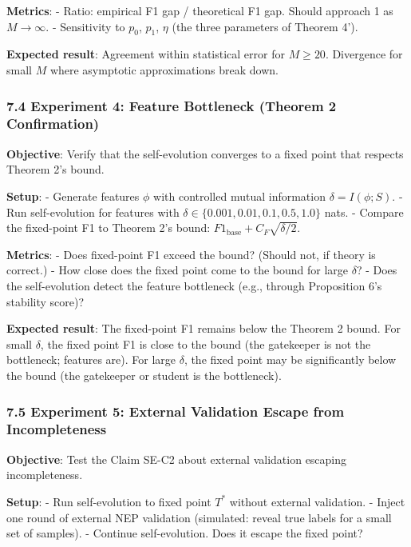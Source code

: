 \documentclass[
  12pt,
]{ctexart}
\begin{document}
\textbf{Metrics}: - Ratio: empirical F1 gap / theoretical F1 gap. Should
approach 1 as \(M \to \infty\). - Sensitivity to \(p_0\), \(p_1\),
\(\eta\) (the three parameters of Theorem 4').

\textbf{Expected result}: Agreement within statistical error for
\(M \geq 20\). Divergence for small \(M\) where asymptotic
approximations break down.

\subsubsection{7.4 Experiment 4: Feature Bottleneck (Theorem 2
Confirmation)}\label{experiment-4-feature-bottleneck-theorem-2-confirmation}

\textbf{Objective}: Verify that the self-evolution converges to a fixed
point that respects Theorem 2's bound.

\textbf{Setup}: - Generate features \(\phi\) with controlled mutual
information \(\delta = I(\phi; S)\). - Run self-evolution for features
with \(\delta \in \{0.001, 0.01, 0.1, 0.5, 1.0\}\) nats. - Compare the
fixed-point F1 to Theorem 2's bound:
\(F1_{\text{base}} + C_F\sqrt{\delta/2}\).

\textbf{Metrics}: - Does fixed-point F1 exceed the bound? (Should not,
if theory is correct.) - How close does the fixed point come to the
bound for large \(\delta\)? - Does the self-evolution detect the feature
bottleneck (e.g., through Proposition 6's stability score)?

\textbf{Expected result}: The fixed-point F1 remains below the Theorem 2
bound. For small \(\delta\), the fixed point F1 is close to the bound
(the gatekeeper is not the bottleneck; features are). For large
\(\delta\), the fixed point may be significantly below the bound (the
gatekeeper or student is the bottleneck).

\subsubsection{7.5 Experiment 5: External Validation Escape from
Incompleteness}\label{experiment-5-external-validation-escape-from-incompleteness}

\textbf{Objective}: Test the Claim SE-C2 about external validation
escaping incompleteness.

\textbf{Setup}: - Run self-evolution to fixed point \(T^*\) without
external validation. - Inject one round of external NEP validation
(simulated: reveal true labels for a small set of samples). - Continue
self-evolution. Does it escape the fixed point?
\end{document}
